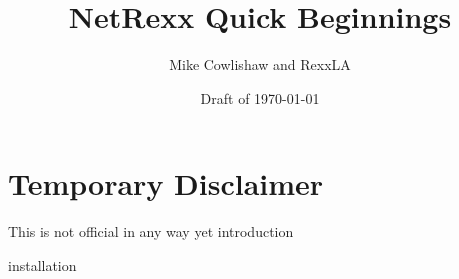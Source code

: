 \documentclass[10pt]{book}
\begin{document}
        
\setcounter{tocdepth}{1} 
\title{NetRexx Quick Beginnings}
\author{Mike Cowlishaw and RexxLA}
\date{Draft of \today}
\maketitle
{}
\pagestyle{plain}
\frontmatter
{}
\pagestyle{plain}
\section*{Temporary Disclaimer}
This is not official in any way yet
\newpage
\tableofcontents
\newpage
{}
\frontmatter
\large
 {introduction}
\mainmatter

 {installation}








\backmatter
\listoffigures
\listoftables
\printindex
\end{document}

